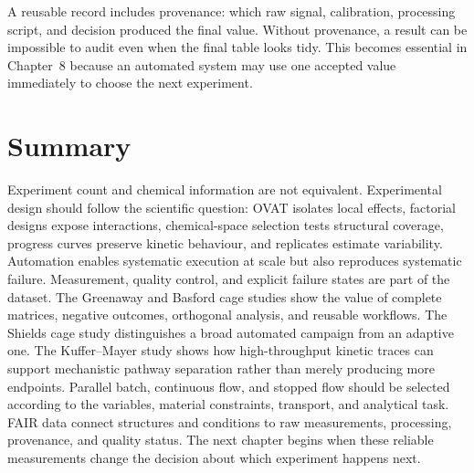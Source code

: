 
A reusable record includes provenance: which raw signal, calibration, processing script, and decision produced the final value.
Without provenance, a result can be impossible to audit even when the final table looks tidy.
This becomes essential in Chapter~8 because an automated system may use one accepted value immediately to choose the next experiment.

\section{Summary}

Experiment count and chemical information are not equivalent.
Experimental design should follow the scientific question: OVAT isolates local effects, factorial designs expose interactions, chemical-space selection tests structural coverage, progress curves preserve kinetic behaviour, and replicates estimate variability.
Automation enables systematic execution at scale but also reproduces systematic failure.
Measurement, quality control, and explicit failure states are part of the dataset.
The Greenaway and Basford cage studies show the value of complete matrices, negative outcomes, orthogonal analysis, and reusable workflows.
The Shields cage study distinguishes a broad automated campaign from an adaptive one.
The Kuffer--Mayer study shows how high-throughput kinetic traces can support mechanistic pathway separation rather than merely producing more endpoints.
Parallel batch, continuous flow, and stopped flow should be selected according to the variables, material constraints, transport, and analytical task.
FAIR data connect structures and conditions to raw measurements, processing, provenance, and quality status.
The next chapter begins when these reliable measurements change the decision about which experiment happens next.
